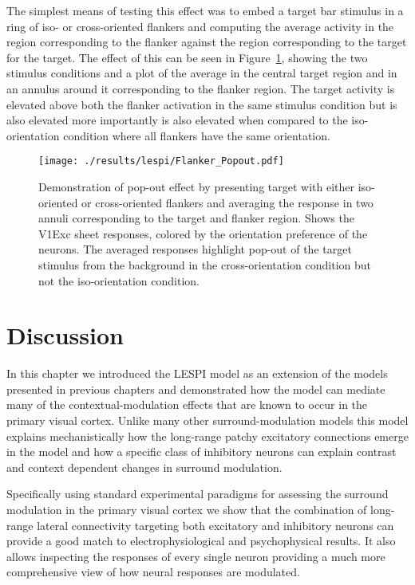 The simplest means of testing this effect was to embed a target bar
stimulus in a ring of iso- or cross-oriented flankers and computing
the average activity in the region corresponding to the flanker
against the region corresponding to the target for the target. The
effect of this can be seen in Figure~\ref{Flanker_PopOut}, showing the
two stimulus conditions and a plot of the average in the central
target region and in an annulus around it corresponding to the flanker
region. The target activity is elevated above both the flanker
activation in the same stimulus condition but is also elevated more
importantly is also elevated when compared to the iso-orientation
condition where all flankers have the same orientation.

\begin{figure}
	\centering
        \texttt{[image: ./results/lespi/Flanker\_Popout.pdf]}
	\caption[Pop-out effect in simple flanker paradigm.]{Demonstration
      of pop-out effect by presenting target with either
      iso-oriented or cross-oriented flankers and averaging the
      response in two annuli corresponding to the target and flanker
      region. Shows the V1Exc sheet responses, colored by the
      orientation preference of the neurons. The averaged responses
      highlight pop-out of the target stimulus from the background in
      the cross-orientation condition but not the iso-orientation
      condition.}
	\label{Flanker_PopOut}
\end{figure}

\section{Discussion}

In this chapter we introduced the LESPI model as an extension of the
models presented in previous chapters and demonstrated how the model
can mediate many of the contextual-modulation effects that are known
to occur in the primary visual cortex. Unlike many other 
surround-modulation models this model explains mechanistically how the
long-range patchy excitatory connections emerge in the model and how a
specific class of inhibitory neurons can explain contrast and context
dependent changes in surround modulation.

Specifically using standard experimental paradigms for assessing the
surround modulation in the primary visual cortex we show that the
combination of long-range lateral connectivity targeting both
excitatory and inhibitory neurons can provide a good match to
electrophysiological and psychophysical results. It also allows
inspecting the responses of every single neuron providing a much more
comprehensive view of how neural responses are modulated.

